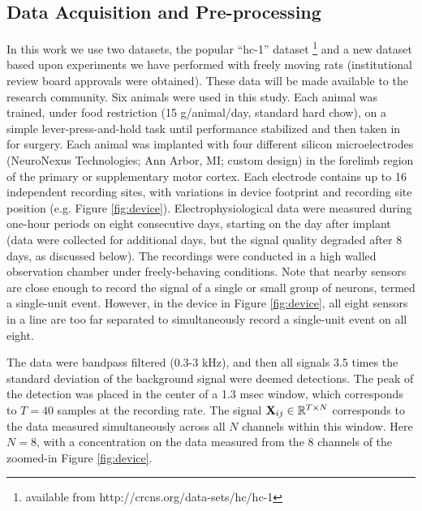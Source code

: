 \documentclass[journal]{IEEEtran}
\newcommand{\jovo}[1]{{\color{magenta}{\it #1}}}
\begin{document}
\subsection{Data Acquisition and Pre-processing} %
\label{sub:data_acquisition_and_pre_processing}


In this work we use two datasets, the popular ``hc-1'' dataset
\footnote{available from http://crcns.org/data-sets/hc/hc-1} and a new dataset based upon experiments we have performed with freely moving rats (institutional review board approvals were obtained). These data will be made available to the research community.  Six animals were used in this study. Each animal was trained, under food restriction (15 g/animal/day, standard hard chow), on a simple lever-press-and-hold task until performance stabilized and then taken in for surgery.  Each animal was implanted with four different silicon microelectrodes  (NeuroNexus Technologies; Ann Arbor, MI; custom design) in the forelimb region of the primary or supplementary motor cortex. Each electrode contains up to 16 independent recording sites, with variations in device footprint and recording site position (e.g. Figure \ref{fig:device}).  Electrophysiological data were measured during one-hour periods on eight consecutive days, starting on the day after implant (data were collected for additional days, but the signal quality degraded after 8 days, as discussed below).  The recordings were conducted in a high walled observation chamber under freely-behaving conditions.  Note that nearby sensors are close enough to record the signal of a single or small group of neurons, termed a single-unit event. However, in the device in Figure \ref{fig:device}, all eight sensors in a line are too far separated to simultaneously record a single-unit event on all eight.

The data were bandpass filtered (0.3-3 kHz), and
then all signals 3.5 times the standard deviation of the background
signal were deemed detections. The peak of the detection was placed
in the center of a 1.3 msec window, which corresponds to $T=40$
samples at the recording rate. The signal
${\mathbf X}_{ij}\in\mathbb{R}^{T\times N}$ corresponds to the data
measured simultaneously across all $N$ channels within this window.
Here $N=8$, with a concentration on the data measured from the 8
channels of the zoomed-in Figure \ref{fig:device}.%


\end{document}
